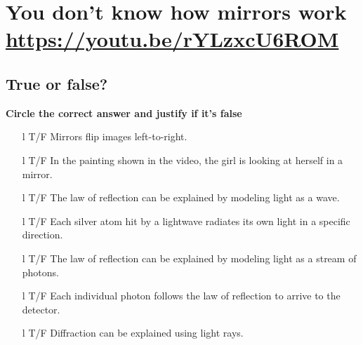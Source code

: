 \documentclass[a4paper, 11pt, final, garamond]{book}
\begin{document}
\setcounter{chapter}{1}


\chapter{You don't know how mirrors work \url{https://youtu.be/rYLzxcU6ROM}}

\section{True or false\!?}

\textbf{Circle the correct answer and justify if it's false}
\begin{enumerate}[label=\sqenumi, leftmargin=10pt]
	\item[l]{T/F} %
	Mirrors flip images left-to-right.
	\smallbreak
	\smallbreak
	\dotfill
	\item[l]{T/F} %
    In the painting shown in the video, the girl is looking at herself in a
    mirror.
	\smallbreak
	\smallbreak
	\dotfill
	\item[l]{T/F} %
    The law of reflection can be explained by modeling light as a wave.
	\smallbreak
	\smallbreak
	\dotfill
	\item[l]{T/F} %
    Each silver atom hit by a lightwave radiates its own light in a specific
    direction.
	\smallbreak
	\smallbreak
	\dotfill
	\item[l]{T/F} %
    The law of reflection can be explained by modeling light as a stream of
    photons.
	\smallbreak
	\smallbreak
	\dotfill
	\item[l]{T/F} %
    Each individual photon follows the law of reflection to arrive to the
    detector.
	\smallbreak
	\smallbreak
	\dotfill
	\item[l]{T/F} %
    Diffraction can be explained using light rays.
	\smallbreak
	\smallbreak
	\dotfill
\end{enumerate}
\end{document}
